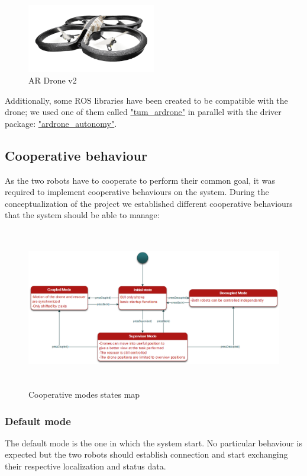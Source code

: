 \documentclass[11pt,a4paper]{article}
\begin{document}
\begin{figure}[ht]	
\centering
\includegraphics[height=3cm]{arDroneGpsEdition.png}
\caption{AR Drone v2}
\end{figure}

Additionally, some ROS libraries have been created to be compatible with the drone; we used
one of them called \href{"http://wiki.ros.org/tum_ardrone"}{"tum\_ardrone"} in parallel with
the driver package: \href{"https://github.com/AutonomyLab/ardrone_autonomy"}
{"ardrone\_autonomy"}.

\subsection{Cooperative behaviour}
As the two robots have to cooperate to perform their common goal, it was required to implement
cooperative behaviours on the system. During the conceptualization of the project we established different
cooperative behaviours that the system should be able to manage:

\begin{figure}[ht]	
\includegraphics[height=7cm]{cooperativeModes.png}
\caption{Cooperative modes states map}
\end{figure}

\subsubsection{Default mode}
The default mode is the one in which the system start. No particular behaviour is expected but the two
robots should establish connection and start exchanging their respective localization and status data.
\end{document}
